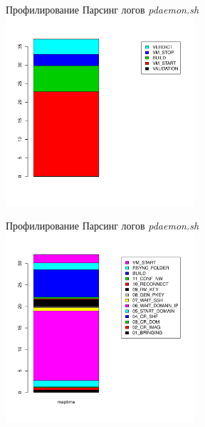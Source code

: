 \documentclass{beamer}
\begin{document}
\begin{frame}{Профилирование}
	Парсинг логов \textit{pdaemon.sh}
	\includegraphics[width=70mm]{./libvirt_bar.pdf}
\end{frame}

\begin{frame}{Профилирование}
	Парсинг логов \textit{pdaemon.sh}
	\includegraphics[width=70mm]{./vm_start_bar.pdf}
\end{frame}
\end{document}
